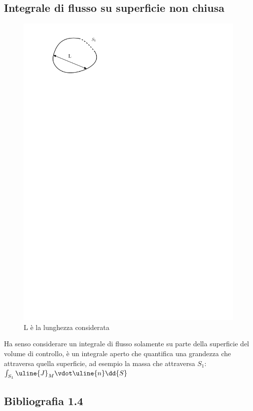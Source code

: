\subsection{Integrale di flusso su superficie non chiusa}
%
	\begin{figure}[ht]
		\includegraphics[scale=0.8]{./1.4 Equazioni di bilancio/1.4-8}
		\centering
		\caption{L è la lunghezza considerata}
	\end{figure}
%
Ha senso considerare un integrale di flusso solamente su parte della superficie del volume di controllo, è un integrale aperto che quantifica una grandezza che attraversa quella superficie, ad esempio la massa che attraversa $S_1$: $\int_{S_1} \uline{J}_M \vdot \uline{n} \dd{S}$
\subsection*{Bibliografia 1.4}
\cite[Cap.\ 1.2, 1.3, 1.6]{LuchiniQuadrio}\\
\cite[Cap.\ 2.5]{PnueliGutfinger}